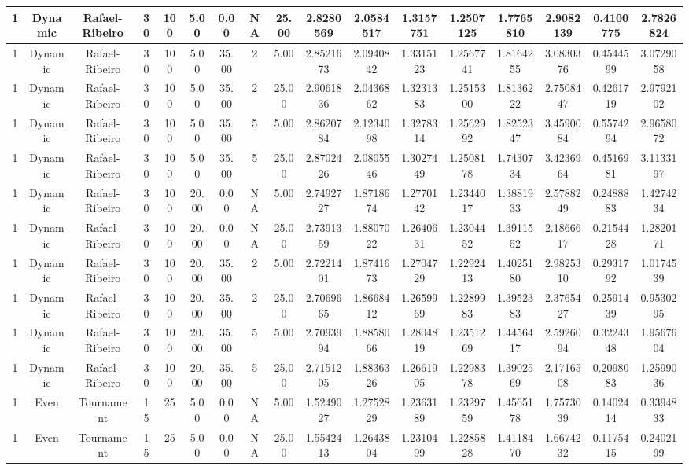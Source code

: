 \begin{longtable}{ | c | c | c | c | c | c | c | c | c | c | c | c | c | c | c | c | c | }
	\hline
	1	&	Dynamic	&	Rafael-Ribeiro	&	30	&	100	&	5.00	&	0.00	&	NA	&	25.00	&	2.8280569	&	2.0584517	&	1.3157751	&	1.2507125	&	1.7765810	&	2.9082139	&	0.4100775	&	2.7826824 \\
	\hline
	1	&	Dynamic	&	Rafael-Ribeiro	&	30	&	100	&	5.00	&	35.00	&	2	&	5.00	&	2.8521673	&	2.0940842	&	1.3315123	&	1.2567741	&	1.8164255	&	3.0830376	&	0.4544599	&	3.0729058 \\
	\hline
	1	&	Dynamic	&	Rafael-Ribeiro	&	30	&	100	&	5.00	&	35.00	&	2	&	25.00	&	2.9061836	&	2.0436862	&	1.3231383	&	1.2515300	&	1.8136222	&	2.7508447	&	0.4261719	&	2.9792102 \\
	\hline
	1	&	Dynamic	&	Rafael-Ribeiro	&	30	&	100	&	5.00	&	35.00	&	5	&	5.00	&	2.8620784	&	2.1234098	&	1.3278314	&	1.2562992	&	1.8252347	&	3.4590084	&	0.5574294	&	2.9658072 \\
	\hline
	1	&	Dynamic	&	Rafael-Ribeiro	&	30	&	100	&	5.00	&	35.00	&	5	&	25.00	&	2.8702426	&	2.0805546	&	1.3027449	&	1.2508178	&	1.7430734	&	3.4236964	&	0.4516981	&	3.1133197 \\
	\hline
	1	&	Dynamic	&	Rafael-Ribeiro	&	30	&	100	&	20.00	&	0.00	&	NA	&	5.00	&	2.7492727	&	1.8718674	&	1.2770142	&	1.2344017	&	1.3881933	&	2.5788249	&	0.2488883	&	1.4274234 \\
	\hline
	1	&	Dynamic	&	Rafael-Ribeiro	&	30	&	100	&	20.00	&	0.00	&	NA	&	25.00	&	2.7391359	&	1.8807022	&	1.2640631	&	1.2304452	&	1.3911552	&	2.1866617	&	0.2154428	&	1.2820171 \\
	\hline
	1	&	Dynamic	&	Rafael-Ribeiro	&	30	&	100	&	20.00	&	35.00	&	2	&	5.00	&	2.7221401	&	1.8741673	&	1.2704729	&	1.2292413	&	1.4025180	&	2.9825310	&	0.2931792	&	1.0174539 \\
	\hline
	1	&	Dynamic	&	Rafael-Ribeiro	&	30	&	100	&	20.00	&	35.00	&	2	&	25.00	&	2.7069665	&	1.8668412	&	1.2659969	&	1.2289983	&	1.3952383	&	2.3765427	&	0.2591439	&	0.9530295 \\
	\hline
	1	&	Dynamic	&	Rafael-Ribeiro	&	30	&	100	&	20.00	&	35.00	&	5	&	5.00	&	2.7093994	&	1.8858066	&	1.2804819	&	1.2351269	&	1.4456417	&	2.5926094	&	0.3224348	&	1.9567604 \\
	\hline
	1	&	Dynamic	&	Rafael-Ribeiro	&	30	&	100	&	20.00	&	35.00	&	5	&	25.00	&	2.7151205	&	1.8836326	&	1.2661905	&	1.2298378	&	1.3902569	&	2.1716508	&	0.2098083	&	1.2599036 \\
	\hline
	1	&	Even	&	Tournament	&	15	&	25	&	5.00	&	0.00	&	NA	&	5.00	&	1.5249027	&	1.2752829	&	1.2363189	&	1.2329759	&	1.4565178	&	1.7573039	&	0.1402414	&	0.3394833 \\
	\hline
	1	&	Even	&	Tournament	&	15	&	25	&	5.00	&	0.00	&	NA	&	25.00	&	1.5542413	&	1.2643804	&	1.2310499	&	1.2285828	&	1.4118470	&	1.6674232	&	0.1175415	&	0.2402199 \\

\end{longtable}
